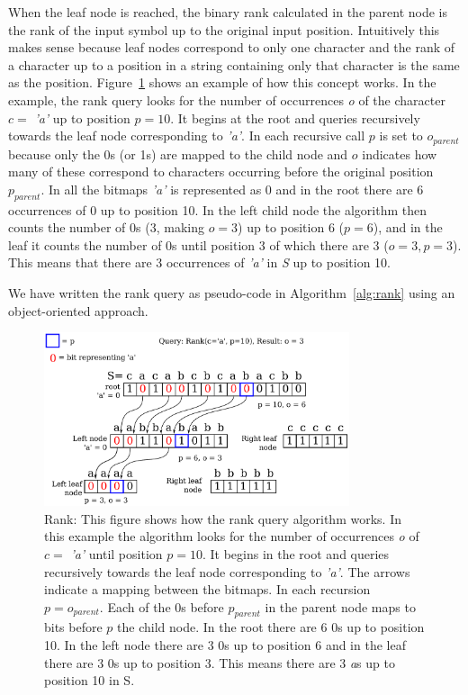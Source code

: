 When the leaf node is reached, the binary rank calculated in the parent node is the rank of the input symbol up to the original input position.
Intuitively this makes sense because leaf nodes correspond to only one character and the rank of a character up to a position in a string containing only that character is the same as the position.
Figure~\ref{fig:RankDrawing} shows an example of how this concept works.
In the example, the rank query looks for the number of occurrences \textit{o} of the character $c = $ \textit{'a'} up to position $p = 10$.
It begins at the root and queries recursively towards the leaf node corresponding to \textit{'a'}. 
In each recursive call $p$ is set to $o_{parent}$ because only the 0s (or 1s) are mapped to the child node and $o$ indicates how many of these correspond to characters occurring before the original position $p_{parent}$.
In all the bitmaps \textit{'a'} is represented as 0 and in the root there are 6 occurrences of 0 up to position 10. 
In the left child node the algorithm then counts the number of 0s (3, making $o=3$) up to position 6 ($p=6$), and in the leaf it counts the number of 0s until position 3 of which there are 3 ($o=3, p=3$). 
This means that there are 3 occurrences of \textit{'a'} in \textit{S} up to position 10.

We have written the rank query as pseudo-code in Algorithm~\ref{alg:rank} using an object-oriented approach.

\begin{figure}
\center \includegraphics[width=0.8\textwidth]{RankDrawing}
\caption{Rank: This figure shows how the rank query algorithm works. 
In this example the algorithm looks for the number of occurrences \textit{o} of $c = $ \textit{'a'} until position $p = 10$.
It begins in the root and queries recursively towards the leaf node corresponding to \textit{'a'}.
The arrows indicate a mapping between the bitmaps.
In each recursion $p = o_{parent}$.
Each of the 0s before $p_{parent}$ in the parent node maps to bits before $p$ the child node.
In the root there are 6 0s up to position 10. 
In the left node there are 3 0s up to position 6
and in the leaf there are 3 0s up to position 3. This means there are 3 \textit{a}s up to position 10 in S.}
\label{fig:RankDrawing}
\end{figure}

